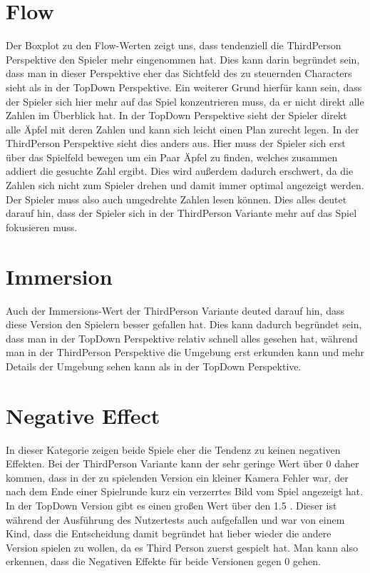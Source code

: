 \section{Flow}
\label{sec:flowDisk}
Der Boxplot zu den Flow-Werten zeigt uns, dass tendenziell die ThirdPerson Perspektive den Spieler mehr eingenommen hat. Dies kann darin begründet sein, dass man in dieser Perspektive eher das Sichtfeld des zu steuernden Characters sieht als in der TopDown Perspektive. Ein weiterer Grund hierfür kann sein, dass der Spieler sich hier mehr auf das Spiel konzentrieren muss, da er nicht direkt alle Zahlen im Überblick hat. In der TopDown Perspektive sieht der Spieler direkt alle Äpfel mit deren Zahlen und kann sich leicht einen Plan zurecht legen. In der ThirdPerson Perspektive sieht dies anders aus. Hier muss der Spieler sich erst über das Spielfeld bewegen um ein Paar Äpfel zu finden, welches zusammen addiert die gesuchte Zahl ergibt. Dies wird außerdem dadurch erschwert, da die Zahlen sich nicht zum Spieler drehen und damit immer optimal angezeigt werden. Der Spieler muss also auch umgedrehte Zahlen lesen können. Dies alles deutet darauf hin, dass der Spieler sich in der ThirdPerson Variante mehr auf das Spiel fokusieren muss. 
\section{Immersion}
\label{sec:immersionDisk}
Auch der Immersions-Wert der ThirdPerson Variante deuted darauf hin, dass diese Version den Spielern besser gefallen hat. Dies kann dadurch begründet sein, dass man in der TopDown Perspektive relativ schnell alles gesehen hat, während man in der ThirdPerson Perspektive die Umgebung erst erkunden kann und mehr Details der Umgebung sehen kann als in der TopDown Perspektive.
\section{Negative Effect}
\label{sec:negeffDisk}
In dieser Kategorie zeigen beide Spiele eher die Tendenz zu keinen negativen Effekten. Bei der ThirdPerson Variante kann der sehr geringe Wert über 0 daher kommen, dass in der zu spielenden Version ein kleiner Kamera Fehler war, der nach dem Ende einer Spielrunde kurz ein verzerrtes Bild vom Spiel angezeigt hat. In der TopDown Version gibt es einen großen Wert über den 1.5 . Dieser ist während der Ausführung des Nutzertests auch aufgefallen und war von einem Kind, dass die Entscheidung damit begründet hat lieber wieder die andere Version spielen zu wollen, da es Third Person zuerst gespielt hat. Man kann also erkennen, dass die Negativen Effekte für beide Versionen gegen 0 gehen.
